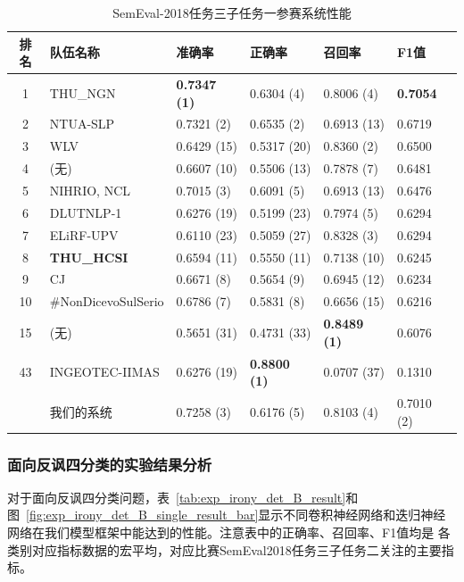 \begin{table}[htb]
  \centering
  \begin{minipage}[t]{\linewidth}
  \caption{SemEval-2018任务三子任务一参赛系统性能}
  \label{tab:exp_irony_det_A_other_comp}
    \begin{tabularx}{\linewidth}{c|X|llll}
    \toprule[1.5pt]
    排名 & 队伍名称 & 准确率 & 正确率 & 召回率 & F1值 \\
    \hline 
    1 & THU\_NGN & \bf 0.7347 (1) & 0.6304 (4) & 0.8006 (4) & \bf 0.7054 \\
    2 & NTUA-SLP & 0.7321 (2) & 0.6535 (2) & 0.6913 (13) & 0.6719 \\
    3 & WLV & 0.6429 (15) & 0.5317 (20) & 0.8360 (2) & 0.6500 \\
    4 & (无) & 0.6607 (10) & 0.5506 (13) & 0.7878 (7) & 0.6481 \\
    5 & NIHRIO, NCL & 0.7015 (3) & 0.6091 (5) & 0.6913 (13) & 0.6476 \\
    6 & DLUTNLP-1 & 0.6276 (19) & 0.5199 (23) & 0.7974 (5) & 0.6294 \\
    7 & ELiRF-UPV & 0.6110 (23) & 0.5059 (27) & 0.8328 (3) & 0.6294 \\
    8 & \bf THU\_HCSI & 0.6594 (11) & 0.5550 (11) & 0.7138 (10) & 0.6245 \\
    9 & CJ & 0.6671 (8) & 0.5654 (9) & 0.6945 (12) & 0.6234 \\ 
    10 & \#NonDicevoSulSerio & 0.6786 (7) & 0.5831 (8) & 0.6656 (15) & 0.6216 \\
    \hline
    15 & (无) & 0.5651 (31) & 0.4731 (33) & \bf 0.8489 (1) & 0.6076 \\
    \hline
    43 & INGEOTEC-IIMAS & 0.6276 (19) & \bf 0.8800 (1) & 0.0707 (37) & 0.1310 \\
    \hline 
    & 我们的系统 & 0.7258 (3) & 0.6176 (5) & 0.8103 (4) & 0.7010 (2) \\
    \bottomrule[1.5pt]
    \end{tabularx}
  \end{minipage}
\end{table}

\subsubsection{面向反讽四分类的实验结果分析}

对于面向反讽四分类问题，表~\ref{tab:exp_irony_det_B_result}和图~\ref{fig:exp_irony_det_B_single_result_bar}显示不同卷积神经网络和迭归神经网络在我们模型框架中能达到的性能。注意表中的正确率、召回率、F1值均是
各类别对应指标数据的宏平均，对应比赛SemEval2018任务三子任务二关注的主要指标。

